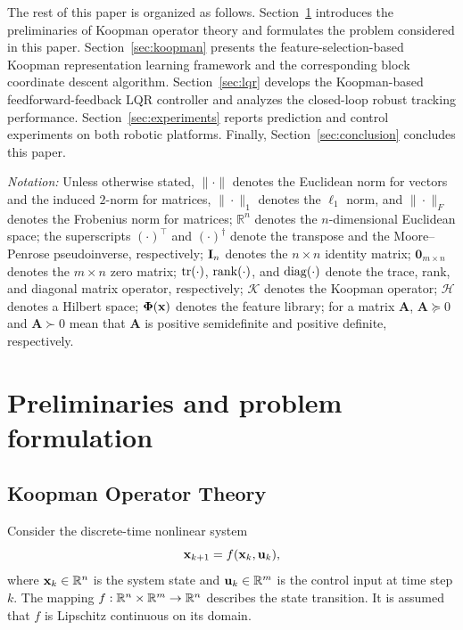 The rest of this paper is organized as follows. Section~\ref{sec:background}
introduces the preliminaries of Koopman operator theory and formulates the
problem considered in this paper. Section~\ref{sec:koopman} presents the
feature-selection-based Koopman representation learning framework and the
corresponding block coordinate descent algorithm. Section~\ref{sec:lqr}
develops the Koopman-based feedforward-feedback LQR controller and analyzes
the closed-loop robust tracking performance. Section~\ref{sec:experiments}
reports prediction and control experiments on both robotic platforms.
Finally, Section~\ref{sec:conclusion} concludes this paper.

\textit{Notation:} Unless otherwise stated,
$\|\cdot\|$ denotes the Euclidean norm for vectors and the induced $2$-norm
for matrices, $\|\cdot\|_1$ denotes the $\ell_1$ norm, and $\|\cdot\|_F$
denotes the Frobenius norm for matrices; $\mathbb{R}^n$ denotes the
$n$-dimensional Euclidean space; the superscripts $(\cdot)^\top$ and
$(\cdot)^\dagger$ denote the transpose and the Moore--Penrose pseudoinverse,
respectively; $\mathbf{I}_n$ denotes the $n \times n$ identity matrix;
$\mathbf{0}_{m \times n}$ denotes the $m \times n$ zero matrix;
$\operatorname{tr}(\cdot)$, $\operatorname{rank}(\cdot)$, and $\operatorname{diag}(\cdot)$ denote the trace, rank, and
diagonal matrix operator, respectively; $\mathcal{K}$ denotes the Koopman
operator; $\mathcal{H}$ denotes a Hilbert space; $\boldsymbol{\Phi}(\mathbf{x})$ denotes the
feature library; for a matrix $\mathbf{A}$, $\mathbf{A} \succeq 0$ and
$\mathbf{A} \succ 0$ mean that $\mathbf{A}$ is positive semidefinite and
positive definite, respectively.


\section{Preliminaries and problem formulation}
\label{sec:background}

\subsection{Koopman Operator Theory}
\label{subsec:koopman_theory}

Consider the discrete-time nonlinear system
\begin{equation}
\mathbf{x}_{k+1} = f(\mathbf{x}_k, \mathbf{u}_k),
\end{equation}
where $\mathbf{x}_k \in \mathbb{R}^n$ is the system state and $\mathbf{u}_k \in \mathbb{R}^m$ is the control input at time step $k$. The mapping $f: \mathbb{R}^n \times \mathbb{R}^m \to \mathbb{R}^n$ describes the state transition. It is assumed that $f$ is Lipschitz continuous on its domain.


